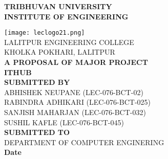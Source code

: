 \documentclass[12 pt]{article}
\begin{document}
\begin{center}

    \thispagestyle{empty}
    {\fontsize{16 pt}{12} \selectfont\textbf{TRIBHUVAN UNIVERSITY} \\
        \textbf{INSTITUTE OF ENGINEERING}} \\
    \vspace{0.3 in}

    \texttt{[image: leclogo21.png]} \\
    \vspace{0.05 in}
    LALITPUR ENGINEERING COLLEGE \\
    KHOLKA POKHARI, LALITPUR \\

    \vspace{0.5 in}
    \textbf{ A PROPOSAL OF MAJOR PROJECT}\\
    {\fontsize{14 pt}{12} \selectfont \textbf{ITHUB}}\\
    \vspace{1.1 in}
    \textbf{ SUBMITTED BY}  \\
    ABHISHEK NEUPANE (LEC-076-BCT-02)   \\
    RABINDRA ADHIKARI (LEC-076-BCT-025) \\
    SANJISH MAHARJAN (LEC-076-BCT-032)  \\
    SUSHIL KAFLE (LEC-076-BCT-045)  \\
    \vspace{1.1 in}
    \textbf{ SUBMITTED TO}  \\
    DEPARTMENT OF COMPUTER ENGINERING \\
    \vspace{0.5 in}
    \textbf{Date} \\
\end{center}
\newpage
\end{document}
